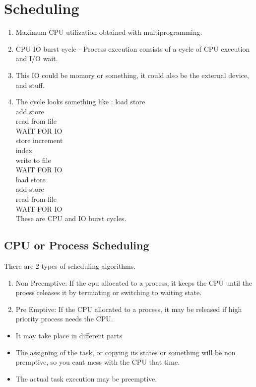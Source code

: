 \documentclass[11pt]{article}
\begin{document}
\section{Scheduling}

\begin{enumerate}
	\item Maximum CPU utilization obtained with multiprogramming. 
	\item CPU IO burst cycle - Process execution consists of a cycle of CPU execution and I/O wait. 
	\item This IO could be momory or something, it could also be the external device, and stuff. 
	\item The cycle looks something like :
	load store\\
	add store\\
	read from file\\
	WAIT FOR IO\\
	store increment\\
	index\\
	write to file\\
	WAIT FOR IO\\
	load store \\
	add store\\
	read from file \\
	WAIT FOR IO\\

	These are CPU and IO burst cycles. 

\end{enumerate}

\subsection{CPU or Process Scheduling}
There are 2 types of scheduling algorithms. 
\begin{enumerate}
	\item Non Preemptive: If the cpu allocated to a process, it keeps the CPU until the proess releases it by termiating or switching to waiting state.
	\item Pre Emptive: If the CPU allocated to a process, it may be released if high priority process needs the CPU.  
\end{enumerate}

\begin{itemize}
	\item It may take place in different parts
	\item The assigning of the task, or copying its states or something will be non premptive, so you cant mess with the CPU that time. 
	\item The actual task execution may be preemptive. 
\end{itemize}
\end{document}
